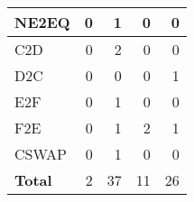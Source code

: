 \begin{tabular}{lrrrr}
            NE2EQ & 0 & 1 & 0 & 0 \\
    \midrule
            C2D & 0 & 2 & 0 & 0 \\
            D2C & 0 & 0 & 0 & 1 \\
    \midrule
            E2F & 0 & 1 & 0 & 0 \\
            F2E & 0 & 1 & 2 & 1 \\
    \midrule
            CSWAP & 0 & 1 & 0 & 0 \\
    \midrule
    \textbf{Total} & 2 & 37 & 11 & 26 \\
    \bottomrule
\end{tabular}
